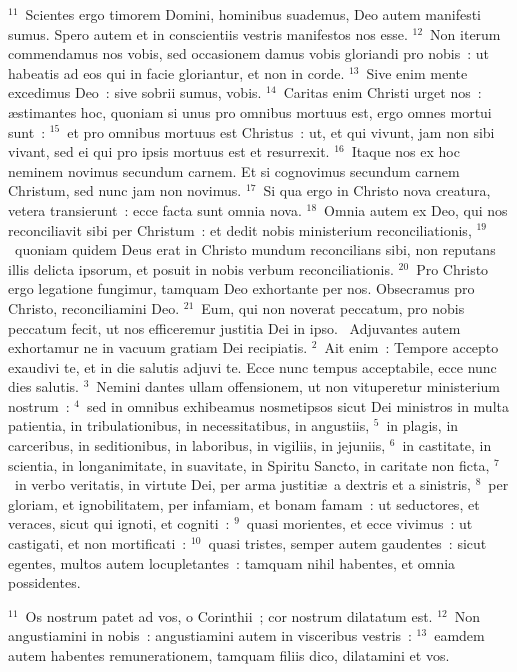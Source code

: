 ${}^{11}$~Scientes ergo timorem Domini, hominibus suademus, Deo autem manifesti sumus. Spero autem et in conscientiis vestris manifestos nos esse.
${}^{12}$~Non iterum commendamus nos vobis, sed occasionem damus vobis gloriandi pro nobis~: ut habeatis ad eos qui in facie gloriantur, et non in corde.
${}^{13}$~Sive enim mente excedimus Deo~: sive sobrii sumus, vobis.
${}^{14}$~Caritas enim Christi urget nos~: \ae stimantes hoc, quoniam si unus pro omnibus mortuus est, ergo omnes mortui sunt~:
${}^{15}$~et pro omnibus mortuus est Christus~: ut, et qui vivunt, jam non sibi vivant, sed ei qui pro ipsis mortuus est et resurrexit.
${}^{16}$~Itaque nos ex hoc neminem novimus secundum carnem. Et si cognovimus secundum carnem Christum, sed nunc jam non novimus.
${}^{17}$~Si qua ergo in Christo nova creatura, vetera transierunt~: ecce facta sunt omnia nova.
${}^{18}$~Omnia autem ex Deo, qui nos reconciliavit sibi per Christum~: et dedit nobis ministerium reconciliationis,
${}^{19}$~quoniam quidem Deus erat in Christo mundum reconcilians sibi, non reputans illis delicta ipsorum, et posuit in nobis verbum reconciliationis.
${}^{20}$~Pro Christo ergo legatione fungimur, tamquam Deo exhortante per nos. Obsecramus pro Christo, reconciliamini Deo.
${}^{21}$~Eum, qui non noverat peccatum, pro nobis peccatum fecit, ut nos efficeremur justitia Dei in ipso.
~Adjuvantes autem exhortamur ne in vacuum gratiam Dei recipiatis.
${}^{2}$~Ait enim~: Tempore accepto exaudivi te, et in die salutis adjuvi te. Ecce nunc tempus acceptabile, ecce nunc dies salutis.
${}^{3}$~Nemini dantes ullam offensionem, ut non vituperetur ministerium nostrum~:
${}^{4}$~sed in omnibus exhibeamus nosmetipsos sicut Dei ministros in multa patientia, in tribulationibus, in necessitatibus, in angustiis,
${}^{5}$~in plagis, in carceribus, in seditionibus, in laboribus, in vigiliis, in jejuniis,
${}^{6}$~in castitate, in scientia, in longanimitate, in suavitate, in Spiritu Sancto, in caritate non ficta,
${}^{7}$~in verbo veritatis, in virtute Dei, per arma justiti\ae\ a dextris et a sinistris,
${}^{8}$~per gloriam, et ignobilitatem, per infamiam, et bonam famam~: ut seductores, et veraces, sicut qui ignoti, et cogniti~:
${}^{9}$~quasi morientes, et ecce vivimus~: ut castigati, et non mortificati~:
${}^{10}$~quasi tristes, semper autem gaudentes~: sicut egentes, multos autem locupletantes~: tamquam nihil habentes, et omnia possidentes.


${}^{11}$~Os nostrum patet ad vos, o Corinthii~; cor nostrum dilatatum est.
${}^{12}$~Non angustiamini in nobis~: angustiamini autem in visceribus vestris~:
${}^{13}$~eamdem autem habentes remunerationem, tamquam filiis dico, dilatamini et vos.


